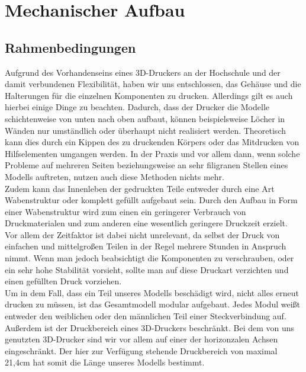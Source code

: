 \chapter{Mechanischer Aufbau}
\section{Rahmenbedingungen}
Aufgrund des Vorhandenseins eines 3D-Druckers an der Hochschule und der damit verbundenen Flexibilität, haben wir uns entschlossen, das Gehäuse und die Halterungen für die einzelnen Komponenten zu drucken.
Allerdings gilt es auch hierbei einige Dinge zu beachten. Dadurch, dass der Drucker die Modelle schichtenweise von unten nach oben aufbaut, können beispielsweise Löcher in Wänden nur umständlich oder überhaupt nicht realisiert werden. Theoretisch kann dies durch ein Kippen des zu druckenden Körpers oder das Mitdrucken von Hilfselementen umgangen werden. In der Praxis und vor allem dann, wenn solche Probleme auf mehreren Seiten beziehungsweise an sehr filigranen Stellen eines Modells auftreten, nutzen auch diese Methoden nichts mehr.\\
Zudem kann das Innenleben der gedruckten Teile entweder durch eine Art Wabenstruktur oder komplett gefüllt aufgebaut sein. Durch den Aufbau in Form einer Wabenstruktur wird zum einen ein geringerer Verbrauch von Druckmaterialen und zum anderen eine wesentlich geringere Druckzeit erzielt. Vor allem der Zeitfaktor ist dabei nicht unrelevant, da selbst der Druck von einfachen und mittelgroßen Teilen in der Regel mehrere Stunden in Anspruch nimmt. Wenn man jedoch beabsichtigt die Komponenten zu verschrauben, oder ein sehr hohe Stabilität vorsieht, sollte man auf diese Druckart verzichten und einen gefüllten Druck vorziehen.\\
Um in dem Fall, dass ein Teil unseres Modells beschädigt wird, nicht alles erneut drucken zu müssen, ist das Gesamtmodell modular aufgebaut. Jedes Modul weißt entweder den weiblichen oder den männlichen Teil einer Steckverbindung auf.\\
Außerdem ist der Druckbereich eines 3D-Druckers beschränkt. Bei dem von uns genutzten 3D-Drucker sind wir vor allem auf einer der horizonzalen Achsen eingeschränkt. Der hier zur Verfügung stehende Druckbereich von maximal 21,4cm hat somit die Länge unseres Modells bestimmt.

